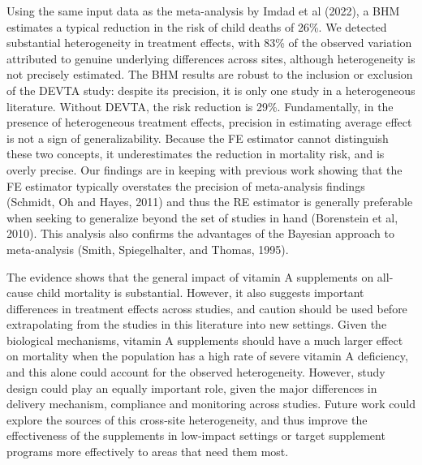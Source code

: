 \documentclass[12pt]{article}
\begin{document}
Using the same input data as the meta-analysis by Imdad et al (2022), a BHM estimates a typical reduction in the risk of child deaths of 26\%. 
We detected substantial heterogeneity in treatment effects, with 83\% of the observed variation attributed to genuine underlying differences across sites, although heterogeneity is not precisely estimated. The BHM results are robust to the inclusion or exclusion of the DEVTA study: despite its precision, it is only one study in a heterogeneous literature. Without DEVTA, the risk reduction is 29\%. 
Fundamentally, in the presence of heterogeneous treatment effects, precision in estimating average effect is not a sign of generalizability. 
Because the FE estimator cannot distinguish these two concepts, it underestimates the reduction in mortality risk, and is overly precise. 
Our findings are in keeping with previous work showing that the FE estimator typically overstates the precision of meta-analysis findings (Schmidt, Oh and Hayes, 2011) and thus the RE estimator is generally preferable when seeking to generalize beyond the set of studies in hand (Borenstein et al, 2010). 
This analysis also confirms the advantages of the Bayesian approach to meta-analysis (Smith, Spiegelhalter, and Thomas, 1995).

The evidence shows that the general impact of vitamin A supplements on all-cause child mortality is substantial. However, it also suggests important differences in treatment effects across studies, and caution should be used before extrapolating from the studies in this literature into new settings. Given the biological mechanisms, vitamin A supplements should have a much larger effect on mortality when the population has a high rate of severe vitamin A deficiency, and this alone could account for the observed heterogeneity. However, study design could play an equally important role, given the major differences in delivery mechanism, compliance and monitoring across studies. Future work could explore the sources of this cross-site heterogeneity, and thus improve the effectiveness of the supplements in low-impact settings or target supplement programs more effectively to areas that need them most.

\clearpage
\end{document}

